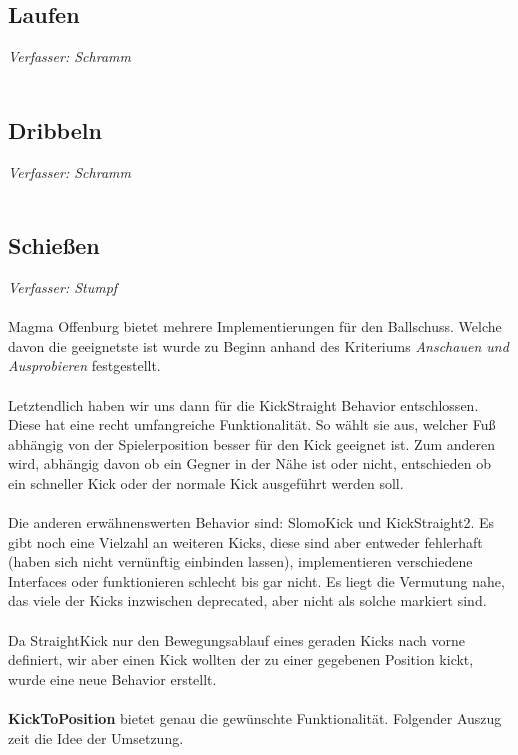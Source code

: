 \documentclass[fontsize=12pt,a4paper,final]{scrartcl}[2003/01/01]
\begin{document}
\subsection{Laufen}\label{sse:Elem Bew:Laufen}
\textit{Verfasser: Schramm}\\
\\

\subsection{Dribbeln}\label{sse:Elem Bew:Dribbeln}
\textit{Verfasser: Schramm}\\
\\

\subsection{Schie{\ss}en}\label{sse:Elem Bew:Schiessen}
\textit{Verfasser: Stumpf}\\
\\
Magma Offenburg bietet mehrere Implementierungen für den Ballschuss. Welche davon die geeignetste ist wurde zu Beginn anhand des Kriteriums \textit{\glqq Anschauen und Ausprobieren\grqq} festgestellt.\\
\\
Letztendlich haben wir uns dann für die KickStraight Behavior entschlossen. Diese hat eine recht umfangreiche Funktionalität. So wählt sie aus, welcher Fuß abhängig von der Spielerposition besser für den Kick geeignet ist. Zum anderen wird, abhängig davon ob ein Gegner in der Nähe ist oder nicht, entschieden ob ein schneller Kick oder der normale Kick ausgeführt werden soll.\\
\\
Die anderen erwähnenswerten Behavior sind: SlomoKick und KickStraight2. Es gibt noch eine Vielzahl an weiteren Kicks, diese sind aber entweder fehlerhaft (haben sich nicht vernünftig einbinden lassen), implementieren verschiedene Interfaces oder funktionieren schlecht bis gar nicht. Es liegt die Vermutung nahe, das viele der Kicks inzwischen deprecated, aber nicht als solche markiert sind.\\
\\
Da StraightKick nur den Bewegungsablauf eines geraden Kicks nach vorne definiert, wir aber einen Kick wollten der zu einer gegebenen Position kickt, wurde eine neue Behavior erstellt.\\
\\
\textbf{KickToPosition} bietet genau die gewünschte Funktionalität. Folgender Auszug zeit die Idee der Umsetzung.
\end{document}
